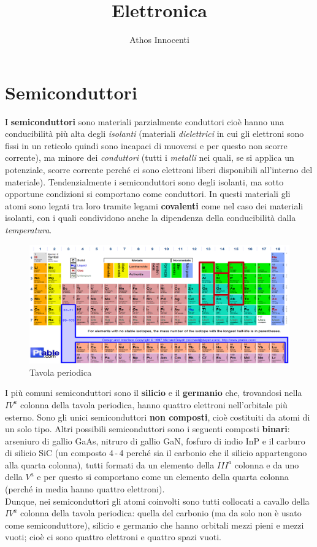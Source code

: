 \documentclass[12pt, a4paper]{report}
\author{Athos Innocenti}
\title{\Huge Elettronica}\date{}\author{}
\begin{document}
\maketitle
\tableofcontents
\chapter{Semiconduttori}
I \textbf{semiconduttori} sono materiali parzialmente conduttori cioè hanno una conducibilità più alta degli \textit{isolanti} (materiali \textit{dielettrici} in cui gli elettroni sono fissi in un reticolo quindi sono incapaci di muoversi e per questo non scorre corrente), ma minore dei \textit{conduttori} (tutti i \textit{metalli} nei quali, se si applica un potenziale, scorre corrente perché ci sono elettroni liberi disponibili all'interno del materiale). Tendenzialmente i semiconduttori sono degli isolanti, ma sotto opportune condizioni si comportano come conduttori. In questi materiali gli atomi sono legati tra loro tramite legami \textbf{covalenti} come nel caso dei materiali isolanti, con i quali condividono anche la dipendenza della conducibilità dalla \textit{temperatura}.
\begin{figure}[h]
\centering
\includegraphics[scale=0.4,angle=0]{tavola_periodica.png}
\caption{Tavola periodica}
\end{figure}

I più comuni semiconduttori sono il \textbf{silicio} e il \textbf{germanio} che, trovandosi nella $IV^{a}$ colonna della tavola periodica, hanno quattro elettroni nell'orbitale più esterno. Sono gli unici semiconduttori \textbf{non composti}, cioè costituiti da atomi di un solo tipo. Altri possibili semiconduttori sono i seguenti composti \textbf{binari}: arseniuro di gallio GaAs, nitruro di gallio GaN, fosfuro di indio InP e il carburo di silicio SiC (un composto 4\,-\,4 perché sia il carbonio che il silicio appartengono alla quarta colonna), tutti formati da un elemento della $III^{a}$ colonna e da uno della $V^{a}$ e per questo si comportano come un elemento della quarta colonna (perché in media hanno quattro elettroni).\\Dunque, nei semiconduttori gli atomi coinvolti sono tutti collocati a cavallo della $IV^{a}$ colonna della tavola periodica: quella del carbonio (ma da solo non è usato come semiconduttore), silicio e germanio che hanno orbitali mezzi pieni e mezzi vuoti; cioè ci sono quattro elettroni e quattro spazi vuoti.
\end{document}
